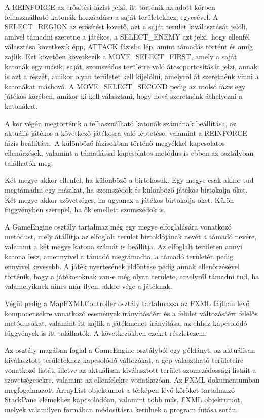 A REINFORCE az erősítési fázist jelzi, itt történik az adott körben felhasználható katonák hozzáadása a saját területekhez, egyesével. A SELECT\_REGION az erősítést követő, azt a saját terület kiválasztását jelöli, amivel támadni szeretne a játékos, a SELECT\_ENEMY azt jelzi, hogy ellenfél választása következik épp, ATTACK fázisba lép, amint támadás történt és amíg zajlik. Ezt követően következik a MOVE\_SELECT\_FIRST, amely a saját katonák egy másik, saját, szomszédos területre való átcsoportosítását jelzi, annak is azt a részét, amikor olyan területet kell kijelölni, amelyről át szeretnénk vinni a katonákat máshová. A MOVE\_SELECT\_SECOND pedig az utolsó fázis egy játékos körében, amikor ki kell választani, hogy hová szeretnénk áthelyezni a katonákat. 

A kör végén megtörténik a felhasználható katonák számának beállítása, az aktuális játékos a következő játékosra való léptetése, valamint a REINFORCE fázis beállítása. A különböző fázisokban történő megyékkel kapcsolatos ellenőrzések, valamint a támadással kapcsolatos metódus is ebben az osztályban találhatók meg. 

Két megye akkor ellenfél, ha különböző a birtokosuk. Egy megye csak akkor tud megtámadni egy másikat, ha szomszédok és különböző játékos birtokolja őket. Két megye akkor szövetséges, ha ugyanaz a játékos birtokolja őket. Külön függvényben szerepel, ha ők emellett szomszédok is. 

A GameEngine osztály tartalmaz még egy megye elfoglalására vonatkozó metódust, mely átállítja az elfoglalt terület birtoklójának nevét a támadó nevére, valamint a két megye katona számát is beállítja. Az elfoglalt területen annyi katona lesz, amennyivel a támadó megtámadta, a támadó területén pedig ennyivel kevesebb. A játék nyertesének eldöntése pedig annak ellenőrzésével történik, hogy a játékosoknak van-e még olyan területe, amelyről támadni tud, ha valamelyiknek nincs már ilyen, akkor vége a játéknak. 

Végül pedig a MapFXMLController osztály tartalmazza az FXML fájlban lévő komponensekre vonatkozó események irányításáért és a felület változásáért felelős metódusokat, valamint itt zajlik a játékmenet irányítása, az ehhez kapcsolódó függvények is itt találhatók. A következőkben ezeket részletezem. 

Az osztály magában foglal a GameEngine osztályból egy példányt, az aktuálisan kiválasztott területekhez kapcsolódó változókat, a gép választható területeire vonatkozó listát, illetve az aktuálisan kiválasztott terület szomszédossági listáit a szövetségesekre, valamint az ellenfelekre vonatkozóan. Az FXML dokumentumban megfogalmazott ArrayList objektumot a térképen lévő köröket tartalmazó StackPane elemekhez kapcsolódóan, valamint több más, FXML objektumot, melyek valamilyen formában módosításra kerülnek a program futása során. 

